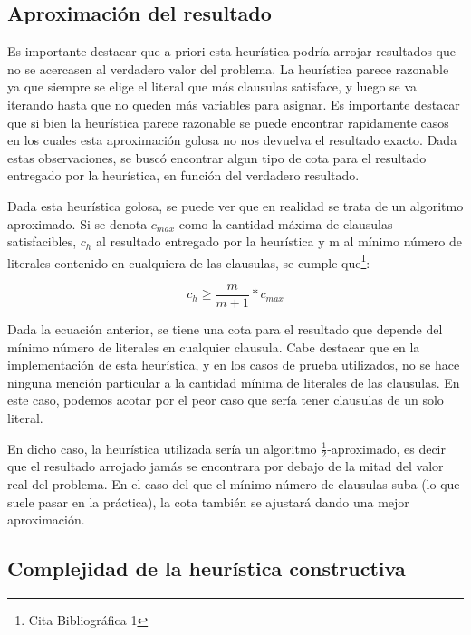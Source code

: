 \documentclass[a4paper,10pt]{article}
\begin{document}
\subsection*{Aproximaci\'on del resultado}

Es importante destacar que a priori esta heur\'istica podr\'ia arrojar resultados que no se acercasen al verdadero valor del problema. La heur\'istica parece razonable ya que siempre se elige el literal que m\'as clausulas satisface, y luego se va iterando hasta que no queden m\'as variables para asignar. Es importante destacar que si bien la heur\'istica parece razonable se puede encontrar rapidamente casos en los cuales esta aproximaci\'on golosa no nos devuelva el resultado exacto. Dada estas observaciones, se busc\'o encontrar algun tipo de cota para el resultado entregado por la heur\'istica, en funci\'on del verdadero resultado.

Dada esta heur\'istica golosa, se puede ver que en realidad se trata de un algoritmo aproximado. Si se denota $c_{max}$ como la cantidad m\'axima de clausulas satisfacibles, $c_h$ al resultado entregado por la heur\'istica y m al m\'inimo n\'umero de literales contenido en cualquiera de las clausulas, se cumple que\footnote{Cita Bibliogr\'afica 1}:


\begin{equation}
c_h \geq \frac{m}{m+1}*c_{max}
\end{equation}

Dada la ecuaci\'on anterior, se tiene una cota para el resultado que depende del m\'inimo n\'umero de literales en cualquier clausula. Cabe destacar que en la implementaci\'on de esta heur\'istica, y en los casos de prueba utilizados, no se hace ninguna menci\'on particular a la cantidad m\'inima de literales de las clausulas. En este caso, podemos acotar por el peor caso que ser\'ia tener clausulas de un solo literal.

En dicho caso, la heur\'istica utilizada ser\'ia un algoritmo $\frac{1}{2}$-aproximado, es decir que el resultado arrojado jam\'as se encontrara por debajo de la mitad del valor real del problema. En el caso del que el m\'inimo n\'umero de clausulas suba (lo que suele pasar en la pr\'actica), la cota tambi\'en se ajustar\'a dando una mejor aproximaci\'on.

\subsection*{Complejidad de la heur\'istica constructiva}
\end{document}
